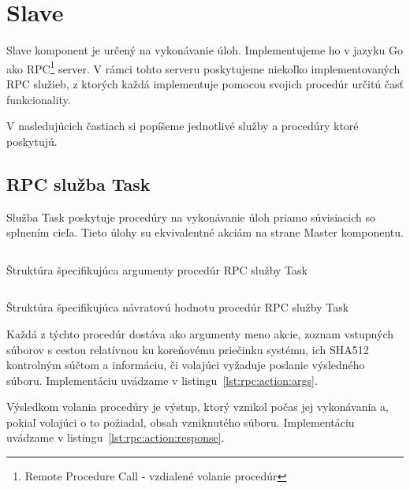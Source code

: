 \section{Slave}
\label{sec:slave}

Slave komponent je určený na vykonávanie úloh. Implementujeme ho v jazyku Go
ako RPC\footnote{Remote Procedure Call - vzdialené volanie procedúr} server.
V rámci tohto serveru poskytujeme niekoľko implementovaných RPC služieb,
z ktorých každá implementuje pomocou svojich procedúr určitú časť funkcionality.

V nasledujúcich častiach si popíšeme jednotlivé služby a procedúry ktoré
poskytujú.

\subsection{RPC služba Task}
\label{sec:slave:rpc:action}

Služba Task poskytuje procedúry na vykonávanie úloh priamo súvisiacich so
splnením cieľa. Tieto úlohy su ekvivalentné akciám na strane Master komponentu.

\begin{listing}[H]
  \inputminted[frame=lines,framesep=2mm,linenos,fontsize=\scriptsize,firstline=8,lastline=12]{go}{/home/pepol/src/imterra/forge/proto/proto.go}
  \caption[Argumenty služby Task]{Štruktúra špecifikujúca argumenty procedúr RPC služby Task}
  \label{lst:rpc:action:args}
\end{listing}

\begin{listing}[H]
  \inputminted[frame=lines,framesep=2mm,linenos,fontsize=\scriptsize,firstline=14,lastline=17]{go}{/home/pepol/src/imterra/forge/proto/proto.go}
  \caption[Návratová hodnota služby Task]{Štruktúra špecifikujúca návratovú hodnotu procedúr RPC služby Task}
  \label{lst:rpc:action:response}
\end{listing}

Každá z týchto procedúr dostáva ako argumenty meno akcie, zoznam vstupných súborov
s cestou relatívnou ku koreňovému priečinku systému, ich SHA512 kontrolným súčtom a informáciu, či volajúci
vyžaduje poslanie výsledného súboru. Implementáciu uvádzame v listingu~\ref{lst:rpc:action:args}.

Výsledkom volania procedúry je výstup, ktorý vznikol počas jej vykonávania a,
pokiaľ volajúci o to požiadal, obsah vzniknutého súboru. Implementáciu uvádzame
v listingu~\ref{lst:rpc:action:response}.

